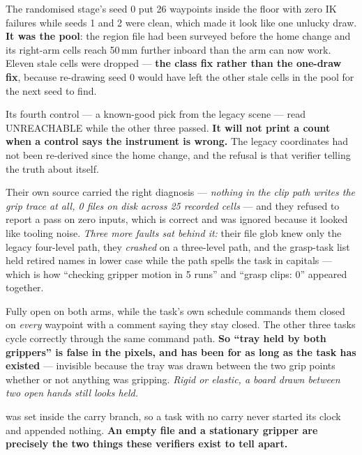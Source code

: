 {The randomised stage's seed 0 put 26 waypoints inside the floor with zero IK
failures while seeds 1 and 2 were clean, which made it look like one unlucky
draw. \textbf{It was the pool}: the region file had been surveyed before the
home change and its right-arm cells reach 50\,mm further inboard than the arm
can now work. Eleven stale cells were dropped --- \textbf{the class fix rather
than the one-draw fix}, because re-drawing seed 0 would have left the other
stale cells in the pool for the next seed to find.}

{Its fourth control --- a known-good pick from the legacy scene --- read
UNREACHABLE while the other three passed. \textbf{It will not print a count when
a control says the instrument is wrong.} The legacy coordinates had not been
re-derived since the home change, and the refusal is that verifier telling the
truth about itself.}

{Their own source carried the right diagnosis --- \emph{nothing in the clip path
writes the grip trace at all, 0 files on disk across 25 recorded cells} --- and
they refused to report a pass on zero inputs, which is correct and was ignored
because it looked like tooling noise. \textit{Three more faults sat behind it:}
their file glob knew only the legacy four-level path, they \emph{crashed} on a
three-level path, and the grasp-task list held retired names in lower case while
the path spells the task in capitals --- which is how ``checking gripper motion
in 5 runs'' and ``grasp clips: 0'' appeared together.}

{Fully open on both arms, while the task's own schedule commands them closed on
\emph{every} waypoint with a comment saying they stay closed. The other three
tasks cycle correctly through the same command path. \textbf{So ``tray held by
both grippers'' is false in the pixels, and has been for as long as the task has
existed} --- invisible because the tray was drawn between the two grip points
whether or not anything was gripping. \emph{Rigid or elastic, a board drawn
between two open hands still looks held.}}

{ was set inside the carry branch, so a task with no carry never
started its clock and appended nothing. \textbf{An empty file and a stationary
gripper are precisely the two things these verifiers exist to tell apart.}}

